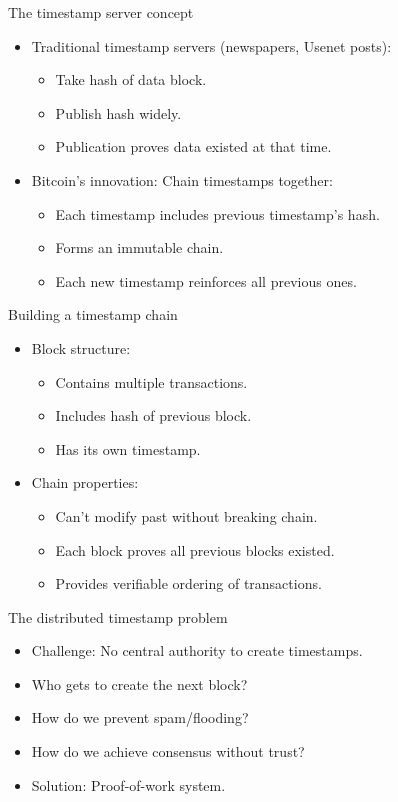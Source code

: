 \documentclass[aspectratio=169, lualatex, handout]{beamer}
\begin{document}
\begin{frame}{The timestamp server concept}
	\begin{itemize}
		\item Traditional timestamp servers (newspapers, Usenet posts):
		      \begin{itemize}
			      \item Take hash of data block.
			      \item Publish hash widely.
			      \item Publication proves data existed at that time.
		      \end{itemize}
		\item Bitcoin's innovation: Chain timestamps together:
		      \begin{itemize}
			      \item Each timestamp includes previous timestamp's hash.
			      \item Forms an immutable chain.
			      \item Each new timestamp reinforces all previous ones.
		      \end{itemize}
	\end{itemize}
\end{frame}

\begin{frame}{Building a timestamp chain}
	\begin{itemize}
		\item Block structure:
		      \begin{itemize}
			      \item Contains multiple transactions.
			      \item Includes hash of previous block.
			      \item Has its own timestamp.
		      \end{itemize}
		\item Chain properties:
		      \begin{itemize}
			      \item Can't modify past without breaking chain.
			      \item Each block proves all previous blocks existed.
			      \item Provides verifiable ordering of transactions.
		      \end{itemize}
	\end{itemize}
\end{frame}

\begin{frame}{The distributed timestamp problem}
	\begin{itemize}
		\item Challenge: No central authority to create timestamps.
		\item Who gets to create the next block?
		\item How do we prevent spam/flooding?
		\item How do we achieve consensus without trust?
		\item Solution: Proof-of-work system.
	\end{itemize}
\end{frame}
\end{document}
